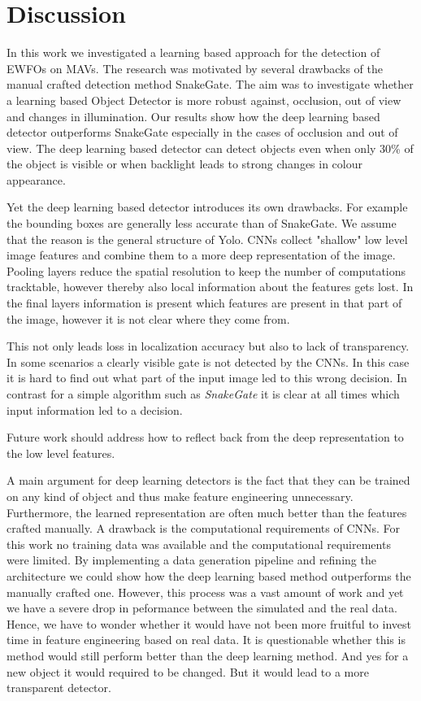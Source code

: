 \chapter{Discussion}

In this work we investigated a learning based approach for the detection of \acp{EWFO} on \acp{MAV}. The research was motivated by several drawbacks of the manual crafted detection method SnakeGate. The aim was to investigate whether a learning based Object Detector is more robust against, occlusion, out of view and changes in illumination. Our results show how the deep learning based detector outperforms SnakeGate especially in the cases of occlusion and out of view. The deep learning based detector can detect objects even when only 30\% of the object is visible or when backlight leads to strong changes in colour appearance.

Yet the deep learning based detector introduces its own drawbacks. For example the bounding boxes are generally less accurate than of SnakeGate. We assume that the reason is the general structure of \ac{Yolo}. \acp{CNN} collect "shallow" low level image features and combine them to a more deep representation of the image. Pooling layers reduce the spatial resolution to keep the number of computations tracktable, however thereby also local information about the features gets lost. In the final layers information is present which features are present in that part of the image, however it is not clear where they come from. 

This not only leads loss in localization accuracy but also to lack of transparency. In some scenarios a clearly visible gate is not detected by the \acp{CNN}. In this case it is hard to find out what part of the input image led to this wrong decision. In contrast for a simple algorithm such as  \textit{SnakeGate} it is clear at all times which input information led to a decision.

 Future work should address how to reflect back from the deep representation to the low level features.

A main argument for deep learning detectors is the fact that they can be trained on any kind of object and thus make feature engineering unnecessary. Furthermore, the learned representation are often much better than the features crafted manually. A drawback is the computational requirements of \acp{CNN}. For this work no training data was available and the computational requirements were limited. By implementing a data generation pipeline and refining the architecture we could show how the deep learning based method outperforms the manually crafted one. However, this process was a vast amount of work and yet we have a severe drop in peformance between the simulated and the real data. Hence, we have to wonder whether it would have not been more fruitful to invest time in feature engineering based on real data. It is questionable whether this is method would still perform better than the deep learning method. And yes for a new object it would required to be changed. But it would lead to a more transparent detector.

